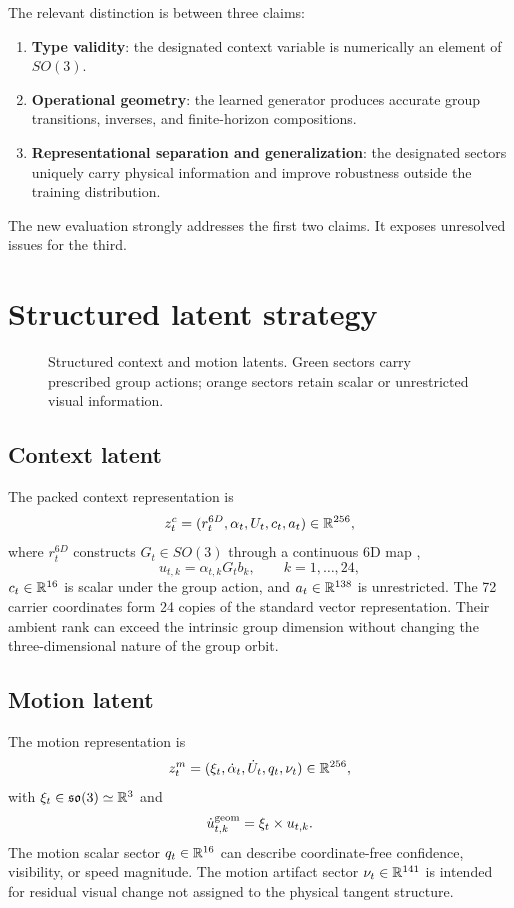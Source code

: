 \documentclass[11pt,a4paper]{article}
\begin{document}
The relevant distinction is between three claims:
\begin{enumerate}[leftmargin=*]
\item \textbf{Type validity}: the designated context variable is numerically an element of $SO(3)$.
\item \textbf{Operational geometry}: the learned generator produces accurate group transitions, inverses, and finite-horizon compositions.
\item \textbf{Representational separation and generalization}: the designated sectors uniquely carry physical information and improve robustness outside the training distribution.
\end{enumerate}
The new evaluation strongly addresses the first two claims. It exposes unresolved issues for the third.

\section{Structured latent strategy}
\begin{figure}[H]\centering\resizebox{\textwidth}{!}{}\caption{Structured context and motion latents. Green sectors carry prescribed group actions; orange sectors retain scalar or unrestricted visual information.}\end{figure}

\subsection{Context latent}
The packed context representation is
\begin{equation}
z_t^c=(r_t^{6D},\alpha_t,U_t,c_t,a_t)\in\mathbb R^{256},
\end{equation}
where $r_t^{6D}$ constructs $G_t\in SO(3)$ through a continuous 6D map \citep{zhou2019rotation6d},
\begin{equation}
u_{t,k}=\alpha_{t,k}G_tb_k,\qquad k=1,\ldots,24,
\end{equation}
$c_t\in\mathbb R^{16}$ is scalar under the group action, and $a_t\in\mathbb R^{138}$ is unrestricted. The 72 carrier coordinates form 24 copies of the standard vector representation. Their ambient rank can exceed the intrinsic group dimension without changing the three-dimensional nature of the group orbit.

\subsection{Motion latent}
The motion representation is
\begin{equation}
z_t^m=(\xi_t,\dot\alpha_t,\dot U_t,q_t,\nu_t)\in\mathbb R^{256},
\end{equation}
with $\xi_t\in\mathfrak{so}(3)\simeq\mathbb R^3$ and
\begin{equation}
\dot u_{t,k}^{\rm geom}=\xi_t\times u_{t,k}.
\end{equation}
The motion scalar sector $q_t\in\mathbb R^{16}$ can describe coordinate-free confidence, visibility, or speed magnitude. The motion artifact sector $\nu_t\in\mathbb R^{141}$ is intended for residual visual change not assigned to the physical tangent structure.
\end{document}
